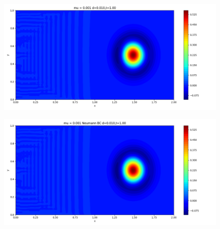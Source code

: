 \documentclass[12pt]{article}
\begin{document}
\begin{figure}[H]
\begin{minipage}{\linewidth}
\begin{minipage}{0.5\textwidth}
    \includegraphics[width=\linewidth]{figuresmu/mu3d0.010t1.00.png}
    \label{fig3}
    \end{minipage}\hfill
    \begin{minipage}{0.5\textwidth}
    \includegraphics[width=\linewidth]{figuresmu/mu3Nud0.010t1.00.png}
    \label{fig4}
\end{minipage}
\vspace{-1.5em}


\end{minipage}
\end{figure}
\end{document}
